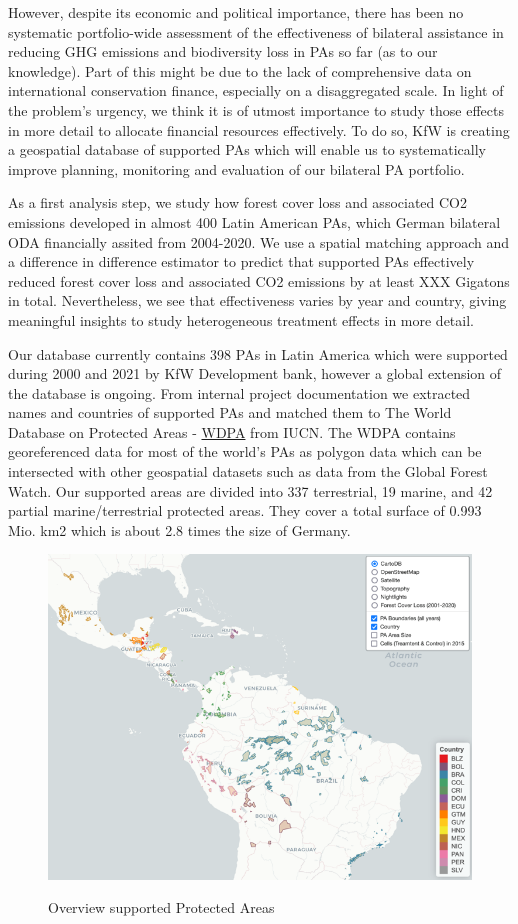 \documentclass{article}
\begin{document}
However, despite its economic and political importance, there has been no systematic portfolio-wide assessment of the effectiveness of bilateral assistance in reducing GHG emissions and biodiversity loss in PAs so far (as to our knowledge). Part of this might be due to the lack of comprehensive data on international conservation finance, especially on a disaggregated scale. In light of the problem's urgency, we think it is of utmost importance to study those effects in more detail to allocate financial resources effectively. To do so, KfW is creating a geospatial database of supported PAs which will enable us to systematically improve planning, monitoring and evaluation of our bilateral PA portfolio. 

As a first analysis step, we study how forest cover loss and associated CO2 emissions developed in almost 400 Latin American PAs, which German bilateral ODA financially assited from 2004-2020. We use a spatial matching approach and a difference in difference estimator to predict that supported PAs effectively reduced forest cover loss and associated CO2 emissions by at least \color{red}XXX \color{black} Gigatons in total. Nevertheless, we see that effectiveness varies by year and country, giving meaningful insights to study heterogeneous treatment effects in more detail.

\newpage

Our database currently contains 398 PAs in Latin America which were supported during 2000 and 2021 by KfW Development bank, however a global extension of the database is ongoing. From internal project documentation we extracted names and countries of supported PAs and matched them to The World Database on Protected Areas - \href{https://www.protectedplanet.net/en}{WDPA} from IUCN. The WDPA contains georeferenced data for most of the world's PAs as polygon data which can be intersected with other geospatial datasets such as data from the Global Forest Watch. Our supported areas are divided into 337 terrestrial, 19 marine, and 42 partial marine/terrestrial protected areas. They cover a total surface of 0.993 Mio. km2 which is about 2.8 times the size of Germany. 

\begin{figure}[H]
\centering
\caption{Overview supported Protected Areas}
\includegraphics[width=0.8\linewidth]{"figures/PAs"}
\label{fig:PAs}
\end{figure}
\end{document}
